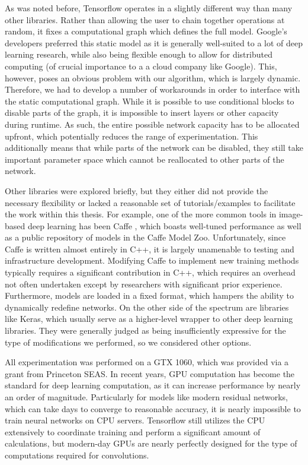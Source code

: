 As was noted before, Tensorflow operates in a slightly different way than many other libraries.
Rather than allowing the user to chain together operations at random, it fixes a computational graph which defines the full model.
Google's developers preferred this static model as it is generally well-suited to a lot of deep learning research, while also being flexible enough to allow for distributed computing (of crucial importance to a a cloud company like Google).
This, however, poses an obvious problem with our algorithm, which is largely dynamic.
Therefore, we had to develop a number of workarounds in order to interface with the static computational graph.
While it is possible to use conditional blocks to disable parts of the graph, it is impossible to insert layers or other capacity during runtime.
As such, the entire possible network capacity has to be allocated upfront, which potentially reduces the range of experimentation.
This additionally means that while parts of the network can be disabled, they still take important parameter space which cannot be reallocated to other parts of the network.

Other libraries were explored briefly, but they either did not provide the necessary flexibility or lacked a reasonable set of tutorials/examples to facilitate the work within this thesis.
For example, one of the more common tools in image-based deep learning has been Caffe \cite{jia2014caffe}, which boasts well-tuned performance as well as a public repository of models in the Caffe Model Zoo.
Unfortunately, since Caffe is written almost entirely in C++, it is largely unamenable to testing and infrastructure development.
Modifying Caffe to implement new training methods typically requires a significant contribution in C++, which requires an overhead not often undertaken except by researchers with significant prior experience.
Furthermore, models are loaded in a fixed format, which hampers the ability to dynamically redefine networks.
On the other side of the spectrum are libraries like Keras, which usually serve as a higher-level wrapper to other deep learning libraries.
They were generally judged as being insufficiently expressive for the type of modifications we performed, so we considered other options.

All experimentation was performed on a GTX 1060, which was provided via a grant from Princeton SEAS.
In recent years, GPU computation has become the standard for deep learning computation, as it can increase performance by nearly an order of magnitude.
Particularly for models like modern residual networks, which can take days to converge to reasonable accuracy, it is nearly impossible to train neural networks on CPU servers.
Tensorflow still utilizes the CPU extensively to coordinate training and perform a significant amount of calculations, but modern-day GPUs are nearly perfectly designed for the type of computations required for convolutions.


